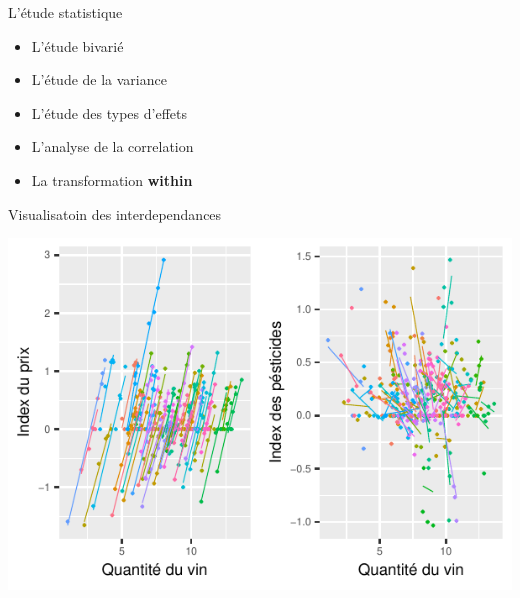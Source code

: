 \documentclass[11pt,ignorenonframetext,]{beamer}
\providecommand{\tightlist}{%
  \setlength{\itemsep}{0pt}\setlength{\parskip}{0pt}}
\begin{document}
\begin{frame}{L'étude statistique}
\protect\hypertarget{letude-statistique-1}{}

\begin{itemize}
\tightlist
\item
  L'étude bivarié
\item
  L'étude de la variance
\item
  L'étude des types d'effets
\item
  L'analyse de la correlation
\item
  La transformation \textbf{within}
\end{itemize}

\end{frame}

\begin{frame}{Visualisatoin des interdependances}
\protect\hypertarget{visualisatoin-des-interdependances}{}

\tiny

\begin{center}\includegraphics{Presentation_files/figure-beamer/unnamed-chunk-17-1} \end{center}

\normalsize

\end{frame}
\end{document}
